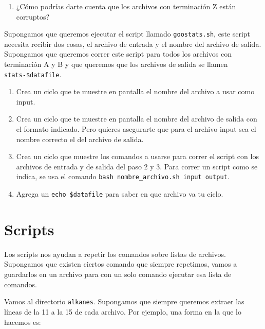 \documentclass[
]{book}
\newenvironment{Shaded}{\begin{snugshade}}{\end{snugshade}}
\newcommand{\AttributeTok}[1]{\textcolor[rgb]{0.13,0.29,0.53}{#1}}
\newcommand{\ExtensionTok}[1]{#1}
\newcommand{\FunctionTok}[1]{\textcolor[rgb]{0.13,0.29,0.53}{\textbf{#1}}}
\newcommand{\KeywordTok}[1]{\textcolor[rgb]{0.13,0.29,0.53}{\textbf{#1}}}
\newcommand{\NormalTok}[1]{#1}
\providecommand{\tightlist}{%
  \setlength{\itemsep}{0pt}\setlength{\parskip}{0pt}}
\begin{document}
\begin{enumerate}
\def\labelenumi{\arabic{enumi})}
\tightlist
\item
  ¿Cómo podrías darte cuenta que los archivos con terminación Z están corruptos?
\end{enumerate}

Supongamos que queremos ejecutar el script llamado \texttt{goostats.sh}, este script necesita recibir dos cosas, el archivo de entrada y el nombre del archivo de salida. Supongamos que queremos correr este script para todos los archivos con terminación A y B y que queremos que los archivos de salida se llamen \texttt{stats-\$datafile}.

\begin{enumerate}
\def\labelenumi{\arabic{enumi})}
\setcounter{enumi}{1}
\item
  Crea un ciclo que te muestre en pantalla el nombre del archivo a usar como input.
\item
  Crea un ciclo que te muestre en pantalla el nombre del archivo de salida con el formato indicado. Pero quieres asegurarte que para el archivo input sea el nombre correcto el del archivo de salida.
\item
  Crea un ciclo que muestre los comandos a usarse para correr el script con los archivos de entrada y de salida del paso 2 y 3. Para correr un script como se indica, se usa el comando \texttt{bash\ nombre\_archivo.sh\ input\ output}.
\item
  Agrega un \texttt{echo\ \$datafile} para saber en que archivo va tu ciclo.
\end{enumerate}

\hypertarget{scripts}{%
\section{Scripts}\label{scripts}}

Los scripts nos ayudan a repetir los comandos sobre listas de archivos. Supongamos que existen ciertos comando que siempre repetimos, vamos a guardarlos en un archivo para con un solo comando ejecutar esa lista de comandos.

Vamos al directorio \texttt{alkanes}. Supongamos que siempre queremos extraer las líneas de la 11 a la 15 de cada archivo. Por ejemplo, una forma en la que lo hacemos es:

\begin{Shaded}
\end{Shaded}
\end{document}
